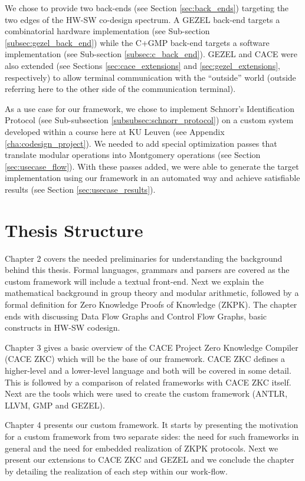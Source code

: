 We chose to provide two back-ends (see Section \ref{sec:back_ends})
targeting the two edges of the HW-SW co-design spectrum.  A GEZEL
back-end targets a combinatorial hardware implementation (see
Sub-section \ref{subsec:gezel_back_end}) while the C+GMP back-end
targets a software implementation (see Sub-section
\ref{subsec:c_back_end}). GEZEL and CACE were also extended (see
Sections \ref{sec:cace_extensions} and \ref{sec:gezel_extensions},
respectively) to allow terminal communication with the ``outside''
world (outside referring here to the other side of the communication
terminal).

As a use case for our framework, we chose to implement Schnorr's
Identification Protocol (see Sub-subsection
\ref{subsubsec:schnorr_protocol}) on a custom system developed within
a course here at KU Leuven (see Appendix \ref{cha:codesign_project}).
We needed to add special optimization passes that translate modular
operations into Montgomery operations (see Section
\ref{sec:usecase_flow}). With these passes added, we were able to
generate the target implementation using our framework in an automated
way and achieve satisfiable results (see Section
\ref{sec:usecase_results}).

\section{Thesis Structure}

Chapter 2 covers the needed preliminaries for understanding the
background behind this thesis. Formal languages, grammars and parsers
are covered as the custom framework will include a textual front-end.
Next we explain the mathematical background in group theory and
modular arithmetic, followed by a formal definition for Zero Knowledge
Proofs of Knowledge (ZKPK). The chapter ends with discussing Data Flow
Graphs and Control Flow Graphs, basic constructs in HW-SW codesign.

Chapter 3 gives a basic overview of the CACE Project Zero Knowledge
Compiler (CACE ZKC) which will be the base of our framework. CACE ZKC
defines a higher-level and a lower-level language and both will be
covered in some detail. This is followed by a comparison of related
frameworks with CACE ZKC itself. Next are the tools which were used to
create the custom framework (ANTLR, LLVM, GMP and GEZEL).

Chapter 4 presents our custom framework. It starts by presenting the
motivation for a custom framework from two separate sides: the need
for such frameworks in general and the need for embedded realization
of ZKPK protocols. Next we present our extensions to CACE ZKC and
GEZEL and we conclude the chapter by detailing the realization of each
step within our work-flow.

